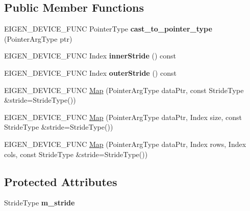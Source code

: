 \subsection*{Public Member Functions}
\begin{DoxyCompactItemize}
\item 
\mbox{\label{class_eigen_1_1_map_a29520259feacbf700c674aeaf0779349}} 
E\+I\+G\+E\+N\+\_\+\+D\+E\+V\+I\+C\+E\+\_\+\+F\+U\+NC Pointer\+Type {\bfseries cast\+\_\+to\+\_\+pointer\+\_\+type} (Pointer\+Arg\+Type ptr)
\item 
\mbox{\label{class_eigen_1_1_map_a5472140b9336d39eabd4f81042bb4754}} 
E\+I\+G\+E\+N\+\_\+\+D\+E\+V\+I\+C\+E\+\_\+\+F\+U\+NC Index {\bfseries inner\+Stride} () const
\item 
\mbox{\label{class_eigen_1_1_map_a093dbac0c6fc7ce050f2e0c10280637c}} 
E\+I\+G\+E\+N\+\_\+\+D\+E\+V\+I\+C\+E\+\_\+\+F\+U\+NC Index {\bfseries outer\+Stride} () const
\item 
E\+I\+G\+E\+N\+\_\+\+D\+E\+V\+I\+C\+E\+\_\+\+F\+U\+NC \mbox{\hyperlink{class_eigen_1_1_map_ac95a2928eaa9c727c4499d3723f8f459}{Map}} (Pointer\+Arg\+Type data\+Ptr, const Stride\+Type \&stride=Stride\+Type())
\item 
E\+I\+G\+E\+N\+\_\+\+D\+E\+V\+I\+C\+E\+\_\+\+F\+U\+NC \mbox{\hyperlink{class_eigen_1_1_map_a834d01d67c1401b022f00260e9dd2108}{Map}} (Pointer\+Arg\+Type data\+Ptr, Index size, const Stride\+Type \&stride=Stride\+Type())
\item 
E\+I\+G\+E\+N\+\_\+\+D\+E\+V\+I\+C\+E\+\_\+\+F\+U\+NC \mbox{\hyperlink{class_eigen_1_1_map_a8d94447f7900113cab8e7fd520800d39}{Map}} (Pointer\+Arg\+Type data\+Ptr, Index rows, Index cols, const Stride\+Type \&stride=Stride\+Type())
\end{DoxyCompactItemize}
\subsection*{Protected Attributes}
\begin{DoxyCompactItemize}
\item 
\mbox{\label{class_eigen_1_1_map_a75b01ded651a8cfc8c3ebbffba6391c6}} 
Stride\+Type {\bfseries m\+\_\+stride}
\end{DoxyCompactItemize}


